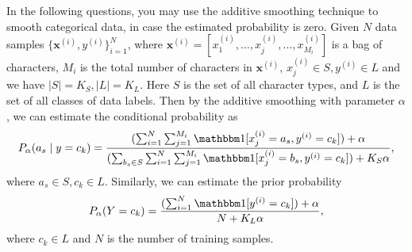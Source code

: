 \documentclass[a4paper]{article}
\theoremstyle{definition}
\newcommand{\vc}[1]{\boldsymbol{#1}}
\def\ind{\mathbbm 1}
\begin{document}
In the following questions, you may use the additive smoothing technique to smooth categorical data, in case the estimated probability is zero. Given $N$ data samples $\{\vc{x}^{(i)}, y^{(i)}\}_{i = 1}^{N}$, where $\vc{x}^{(i)} = [x_1^{(i)}, \dots, x_j^{(i)}, \dots, x_{M_i}^{(i)}]$ is a bag of characters, $M_i$ is the total number of characters in $\vc{x}^{(i)}$, $x_{j}^{(i)} \in S, y^{(i)} \in L$ and we have $|S| = K_S, |L| = K_L$. Here $S$ is the set of all character types, and $L$ is the set of all classes of data labels. Then by the additive smoothing with parameter $\alpha$, we can estimate the conditional probability as 
$$
P_{\alpha}(a_s \mid y = c_k) = \frac{(\sum_{i = 1}^{N}\sum_{j = 1}^{M_i}\ind [x_{j}^{(i)} = a_s, y^{(i)} = c_k]) + \alpha}{(\sum_{b_s \in S}\sum_{i = 1}^{N}\sum_{j = 1}^{M_i}\ind [x_{j}^{(i)} = b_s, y^{(i)} = c_k]) + K_S \alpha},
$$
where $a_s \in S, c_k \in L$. Similarly, we can estimate the prior probability
$$
P_{\alpha}(Y = c_k) = \frac{(\sum_{i = 1}^{N}\ind [y^{(i)} = c_k]) + \alpha}{N + K_L \alpha},
$$
where $c_k \in L$ and $N$ is the number of training samples.
\end{document}
